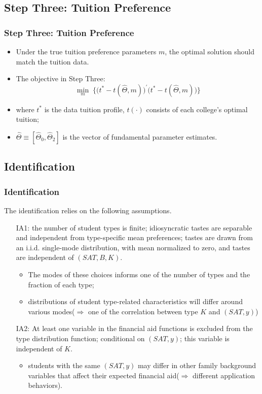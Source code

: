 \documentclass[10pt]{beamer}
\begin{document}
\subsection{Step Three: Tuition Preference}

\begin{frame}[c]\frametitle{Step Three: Tuition Preference}
\begin{itemize}
    \item Under the true tuition preference parameters $m$, the optimal solution should match the tuition data.
    \item The objective in Step Three:
    \begin{equation}
        \min_{m}\;\big\{\big(t^{*}-t(\widehat{\Theta},m)\big)^{\prime}\big(t^{*}-t(\widehat{\Theta},m)\big)\big\}
    \end{equation}
    \item where $t^{*}$ is the data tuition profile, $t(\cdot)$ consists of each college's optimal tuition;
    \item $\widehat{\Theta}\equiv[\widehat{\Theta}_{0},\widehat{\Theta}_{2}]$ is the vector of fundamental parameter estimates.
\end{itemize}

\end{frame}


\subsection{Identification}
\begin{frame}[c]\frametitle{Identification}
 The identification relies on the following assumptions.
\begin{enumerate}
    \item[IA1:]  the number of student types is finite; idiosyncratic tastes are separable and independent from type-specific mean preferences; tastes are drawn from an i.i.d. single-mode distribution, with mean normalized to zero, and tastes are independent of $(SAT,B,K)$.
    \begin{itemize}
        \item  The modes of these choices informs one of the number of types and the fraction of each type;
        \item distributions of student type-related characteristics  will differ around various modes($\Rightarrow$ one of the correlation between type $K$ and $(SAT,y)$)
    \end{itemize}
    \item[IA2:] At least one variable in the financial aid functions is excluded from the type distribution function; conditional on $(SAT,y)$; this variable is independent of $K$.
    \begin{itemize}
        \item  students with the same $(SAT,y)$ may differ in other family background variables that affect their expected financial aid($\Rightarrow$ different application behaviors).
    \end{itemize}

\end{enumerate}


\end{frame}
\end{document}
